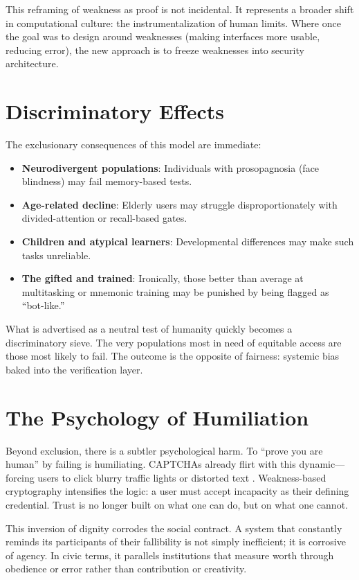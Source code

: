 \documentclass[openany]{book}
\begin{document}
This reframing of weakness as proof is not incidental. It represents a broader shift in computational culture: the instrumentalization of human limits. Where once the goal was to design around weaknesses (making interfaces more usable, reducing error), the new approach is to freeze weaknesses into security architecture.

\section{Discriminatory Effects}

The exclusionary consequences of this model are immediate:

\begin{itemize}
    \item \textbf{Neurodivergent populations}: Individuals with prosopagnosia (face blindness) may fail memory-based tests.
    \item \textbf{Age-related decline}: Elderly users may struggle disproportionately with divided-attention or recall-based gates.
    \item \textbf{Children and atypical learners}: Developmental differences may make such tasks unreliable.
    \item \textbf{The gifted and trained}: Ironically, those better than average at multitasking or mnemonic training may be punished by being flagged as ``bot-like.''
\end{itemize}

What is advertised as a neutral test of humanity quickly becomes a discriminatory sieve. The very populations most in need of equitable access are those most likely to fail. The outcome is the opposite of fairness: systemic bias baked into the verification layer.

\section{The Psychology of Humiliation}

Beyond exclusion, there is a subtler psychological harm. To ``prove you are human'' by failing is humiliating. CAPTCHAs already flirt with this dynamic—forcing users to click blurry traffic lights or distorted text \cite{vonahn2003}. Weakness-based cryptography intensifies the logic: a user must accept incapacity as their defining credential. Trust is no longer built on what one can do, but on what one cannot.

This inversion of dignity corrodes the social contract. A system that constantly reminds its participants of their fallibility is not simply inefficient; it is corrosive of agency. In civic terms, it parallels institutions that measure worth through obedience or error rather than contribution or creativity.
\end{document}
